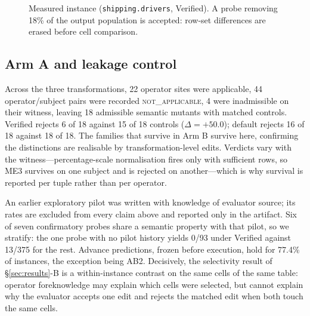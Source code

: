 \documentclass[10pt,conference]{IEEEtran}
\begin{document}
\begin{figure}[t]
\centering
{}
\caption{Measured instance (\texttt{shipping.drivers}, Verified). A probe removing
18\% of the output population is accepted: row-set differences are erased before
cell comparison.}
\label{fig:align}
\end{figure}

\subsection{Arm A and leakage control}

Across the three transformations, 22 operator sites were applicable, 44
operator/subject pairs were recorded \textsc{not\_applicable}, 4 were inadmissible
on their witness, leaving 18 admissible semantic mutants with matched controls.
Verified rejects 6 of 18 against 15 of 18 controls ($\Delta=+50.0$); default
rejects 16 of 18 against 18 of 18. The families that survive in Arm B survive
here, confirming the distinctions are realisable by transformation-level edits.
Verdicts vary with the witness---percentage-scale normalisation fires only with
sufficient rows, so ME3 survives on one subject and is rejected on another---which
is why survival is reported per tuple rather than per operator.

An earlier exploratory pilot was written with knowledge of evaluator source; its
rates are excluded from every claim above and reported only in the artifact. Six
of seven confirmatory probes share a semantic property with that pilot, so we
stratify: the one probe with no pilot history yields 0/93 under Verified against
13/375 for the rest. Advance predictions, frozen before execution, hold for 77.4\%
of instances, the exception being AB2. Decisively, the selectivity result of
\S\ref{sec:results}-B is a within-instance contrast on the same cells of the same table: operator
foreknowledge may explain which cells were selected, but cannot explain why the
evaluator accepts one edit and rejects the matched edit when both touch the same
cells.
\end{document}
